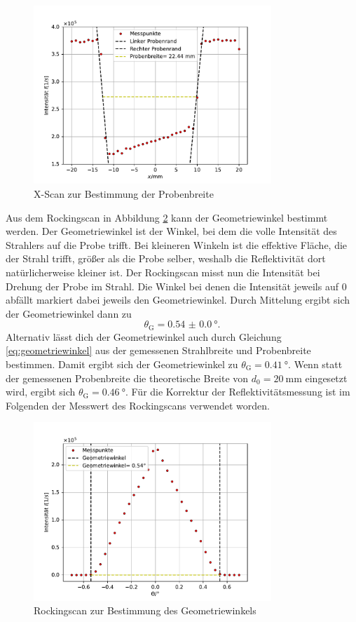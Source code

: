 \begin{figure}[H]
    \centering
    \includegraphics[width=0.8\textwidth]{plots/Xscan.pdf}
    \caption{X-Scan zur Bestimmung der Probenbreite}
    \label{fig:Xscan}
\end{figure}
Aus dem Rockingscan in Abbildung \ref{fig:Rocking} kann der Geometriewinkel bestimmt werden. Der Geometriewinkel ist der Winkel, bei dem die volle Intensität des Strahlers auf die Probe trifft.
Bei kleineren Winkeln ist die effektive Fläche, die der Strahl trifft, größer als die Probe selber, weshalb die Reflektivität dort natürlicherweise kleiner ist.
Der Rockingscan misst nun die Intensität bei Drehung der Probe im Strahl. Die Winkel bei denen die Intensität jeweils auf 0 abfällt markiert dabei jeweils den Geometriewinkel. 
Durch Mittelung ergibt sich der Geometriewinkel dann zu 
\begin{equation*}
    \theta_{\text{G}} = \SI{0.54(0)}{\degree}.
\end{equation*}
Alternativ lässt dich der Geometriewinkel auch durch Gleichung \eqref{eq:geometriewinkel} aus der gemessenen Strahlbreite und Probenbreite bestimmen. 
Damit ergibt sich der Geometriewinkel zu $\theta_{\text{G}} = \SI{0.41}{\degree}$. Wenn statt der gemessenen Probenbreite die theoretische Breite von $d_0=\SI{20}{\milli\meter}$ eingesetzt wird, ergibt sich $\theta_{\text{G}} = \SI{0.46}{\degree}$.
Für die Korrektur der Reflektivitätsmessung ist im Folgenden der Messwert des Rockingscans verwendet worden.
\begin{figure}[H]
    \centering
    \includegraphics[width=0.8\textwidth]{plots/Rocking.pdf}
    \caption{Rockingscan zur Bestimmung des Geometriewinkels}
    \label{fig:Rocking}
\end{figure}
